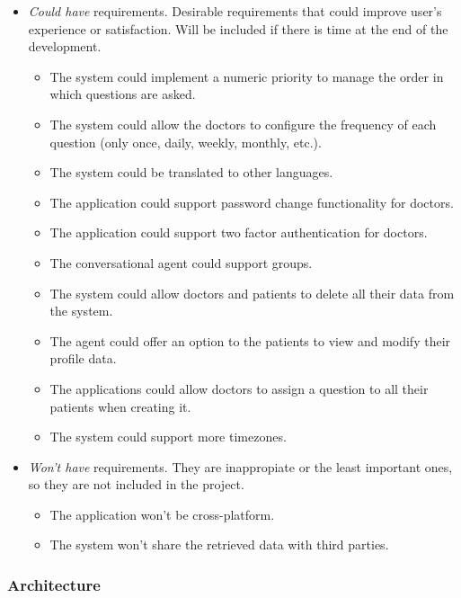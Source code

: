 \documentclass[12pt,english]{article}
\begin{document}
\begin{itemize}
  \item \emph{Could have} requirements. Desirable requirements that could improve user's experience or satisfaction. Will be included if there is time at the end of the development.
    \begin{itemize}
      \item The system could implement a numeric priority to manage the order in which questions are asked.
      \item The system could allow the doctors to configure the frequency of each question (only once, daily, weekly, monthly, etc.).
      \item The system could be translated to other languages.
      \item The application could support password change functionality for doctors.
      \item The application could support two factor authentication for doctors.
      \item The conversational agent could support groups.
      \item The system could allow doctors and patients to delete all their data from the system.
      \item The agent could offer an option to the patients to view and modify their profile data.
      \item The applications could allow doctors to assign a question to all their patients when creating it.
      \item The system could support more timezones.
    \end{itemize}
  \item \emph{Won't have} requirements. They are inappropiate or the least important ones, so they are not included in the project.
    \begin{itemize}
      \item The application won't be cross-platform.
      \item The system won't share the retrieved data with third parties.
    \end{itemize}
\end{itemize}
\newpage
\subsubsection{Architecture}
\end{document}
